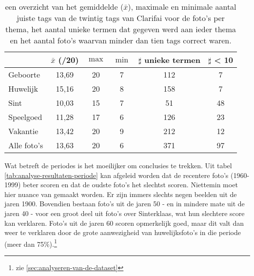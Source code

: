 \begin{table}
    \renewcommand\arraystretch{1.2}
    \centering
	\begin{tabular}{p{3cm}|ccccc}
	 	\toprule
		 & $\bar{x}$ (/20) & $\max$ & $\min$ & $\sharp$ unieke termen & $\sharp$ < 10 \\ 
		\midrule
		Geboorte & 13,69 & 20 & 7 & 112 & 7 \\ 
		Huwelijk & 15,16 & 20 & 8 & 158 & 7 \\ 
		Sint & 10,03 & 15 & 7 & 51 & 48 \\ 
		Speelgoed & 11,28 & 17 & 6 & 126 & 23 \\ 
		Vakantie & 13,42 & 20 & 9 & 212 & 12 \\ 
		Alle foto's & 13,63 & 20 & 6 & 371 & 97 \\ 
	\bottomrule
	\end{tabular} 
	\caption[een overzicht van de resultaten per thema na gebruikt van het ingebouwde model van Clarifai]{een overzicht van het gemiddelde ($\bar{x}$), maximale en minimale aantal juiste tags van de twintig tags van Clarifai voor de foto’s per thema, het aantal unieke termen dat gegeven werd aan ieder thema en het aantal foto’s waarvan minder dan tien tags correct waren. }
	\label{tab:analyse-resultaten-thema}
\end{table}

Wat betreft de periodes is het moeilijker om conclusies te trekken. Uit tabel \ref{tab:analyse-resultaten-periode} kan afgeleid worden dat de recentere foto’s (1960-1999) beter scoren en dat de oudste foto’s het slechtst scoren. Niettemin moet hier nuance van gemaakt worden. Er zijn immers slechts negen beelden uit de jaren 1900. Bovendien bestaan foto’s uit de jaren 50 - en in mindere mate uit de jaren 40 - voor een groot deel uit foto’s over Sinterklaas, wat hun slechtere score kan verklaren. Foto’s uit de jaren 60 scoren opmerkelijk goed, maar dit valt dan weer te verklaren door de grote aanwezigheid van huwelijksfoto’s in die periode (meer dan 75\%).\footnote{zie \ref{sec:analyseren-van-de-dataset}}

